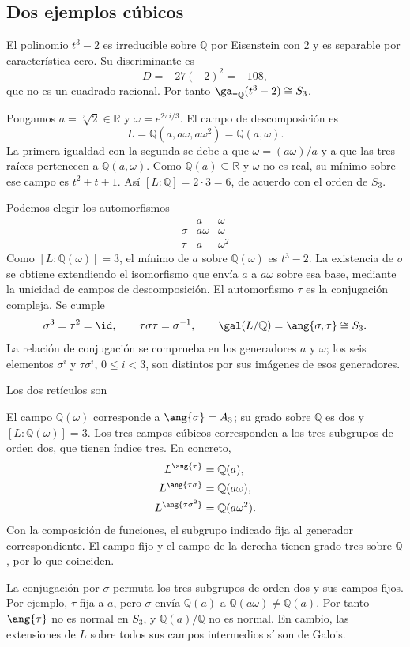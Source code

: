\subsection{Dos ejemplos cúbicos}
\begin{ejem}\label{ejem:C27-s3}
El polinomio $t^3-2$ es irreducible sobre $\mathbb Q$ por Eisenstein con $2$ y es separable por característica cero. Su discriminante es
\[
D=-27(-2)^2=-108,
\]
que no es un cuadrado racional. Por tanto $\gal_{\mathbb Q}(t^3-2)\cong S_3$.

Pongamos $a=\sqrt[3]{2}\in\mathbb R$ y $\omega=e^{2\pi i/3}$. El campo de descomposición es
\[
L=\mathbb Q(a,a\omega,a\omega^2)=\mathbb Q(a,\omega).
\]
La primera igualdad con la segunda se debe a que $\omega=(a\omega)/a$ y a que las tres raíces pertenecen a $\mathbb Q(a,\omega)$. Como $\mathbb Q(a)\subseteq\mathbb R$ y $\omega$ no es real, su mínimo sobre ese campo es $t^2+t+1$. Así $[L:\mathbb Q]=2\cdot3=6$, de acuerdo con el orden de $S_3$.

Podemos elegir los automorfismos
\[
\begin{array}{c|cc}
&a&\omega\\\hline
\sigma&a\omega&\omega\\
\tau&a&\omega^2
\end{array}
\]
Como $[L:\mathbb Q(\omega)]=3$, el mínimo de $a$ sobre $\mathbb Q(\omega)$ es $t^3-2$. La existencia de $\sigma$ se obtiene extendiendo el isomorfismo que envía $a$ a $a\omega$ sobre esa base, mediante la unicidad de campos de descomposición. El automorfismo $\tau$ es la conjugación compleja. Se cumple
\[
\sigma^3=\tau^2=\id,\qquad \tau\sigma\tau=\sigma^{-1},
\qquad \gal(L/\mathbb Q)=\ang{\sigma,\tau}\cong S_3.
\]
La relación de conjugación se comprueba en los generadores $a$ y $\omega$; los seis elementos $\sigma^i$ y $\tau\sigma^i$, $0\leq i<3$, son distintos por sus imágenes de esos generadores.

Los dos retículos son

El campo $\mathbb Q(\omega)$ corresponde a $\ang{\sigma}=A_3$; su grado sobre $\mathbb Q$ es dos y $[L:\mathbb Q(\omega)]=3$. Los tres campos cúbicos corresponden a los tres subgrupos de orden dos, que tienen índice tres. En concreto,
\[
\begin{aligned}
L^{\ang{\tau}}&=\mathbb Q(a),\\
L^{\ang{\tau\sigma}}&=\mathbb Q(a\omega),\\
L^{\ang{\tau\sigma^2}}&=\mathbb Q(a\omega^2).
\end{aligned}
\]
Con la composición de funciones, el subgrupo indicado fija al generador correspondiente. El campo fijo y el campo de la derecha tienen grado tres sobre $\mathbb Q$, por lo que coinciden.

La conjugación por $\sigma$ permuta los tres subgrupos de orden dos y sus campos fijos. Por ejemplo, $\tau$ fija a $a$, pero $\sigma$ envía $\mathbb Q(a)$ a $\mathbb Q(a\omega)\ne\mathbb Q(a)$. Por tanto $\ang{\tau}$ no es normal en $S_3$, y $\mathbb Q(a)/\mathbb Q$ no es normal. En cambio, las extensiones de $L$ sobre todos sus campos intermedios sí son de Galois.
\end{ejem}

